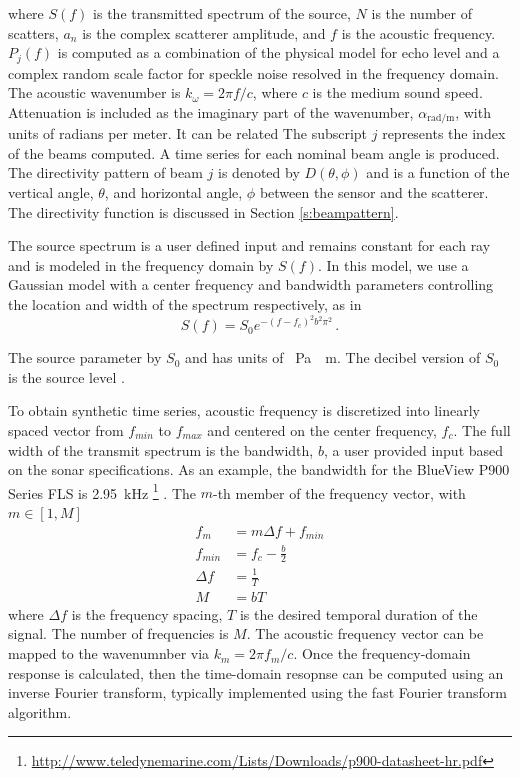 \documentclass[utf8]{frontiersSCNS} %
\begin{document}
where $S(f)$ is the transmitted spectrum of the source, $N$ is the number of scatters, $a_n$ is the complex scatterer amplitude, and $f$ is the acoustic frequency. $P_j(f)$ is computed as a combination of the physical model for echo level and a complex random scale factor for speckle noise resolved in the frequency domain. The acoustic wavenumber is $k_\omega = 2\pi f/c$, where $c$ is the medium sound speed. Attenuation is included as the imaginary part of the wavenumber, $\alpha_{\textrm{rad/m}}$, with units of radians per meter. It can be related The subscript $j$ represents the index of the beams computed. A time series for each nominal beam angle is produced. The directivity pattern of beam $j$ is denoted by $D(\theta,\phi)$ and is a function of the vertical angle, $\theta$, and horizontal angle, $\phi$ between the sensor and the scatterer. The directivity function is discussed in Section \ref{s:beampattern}.

The source spectrum is a user defined input and remains constant for each ray and is modeled in the frequency domain by $S(f)$. In this model, we use a Gaussian model with a center frequency and bandwidth parameters controlling the location and width of the spectrum respectively, as in
\begin{equation}
    S(f) = S_0e^{-(f-f_c)^2b^2\pi^2} \, .
\end{equation}

The source parameter by $S_0$ and has units of \SI{}{\pascal\cdot\meter}. The decibel version of $S_0$ is the source level \citep{urick13principles}.

To obtain synthetic time series, acoustic frequency is discretized into linearly spaced vector from $f_{min}$ to $f_{max}$ and centered on the center frequency, $f_c$. The full width of the transmit spectrum is the bandwidth, $b$, a user provided input based on the sonar specifications. As an example, the bandwidth for the BlueView P900 Series FLS is \SI{2.95}{\kHz} \footnote{\url{http://www.teledynemarine.com/Lists/Downloads/p900-datasheet-hr.pdf}} \citep{blueviewp900}. The $m$-th member of the frequency vector, with $m \in [1,M]$
\begin{align}
    f_m&=m\Delta f +f_{min} \\
    f_{min} &= f_c - \frac{b}{2}\\
    \Delta f &= \frac{1}{T} \\
    M &= bT
\end{align}
where $\Delta f$ is the frequency spacing, $T$ is the desired temporal duration of the signal. The number of frequencies is $M$. The acoustic frequency vector can be mapped to the wavenumnber via $k_m = 2\pi f_m/c$. Once the frequency-domain response is calculated, then the time-domain resopnse can be computed using an inverse Fourier transform, typically implemented using the fast Fourier transform algorithm.
\end{document}
